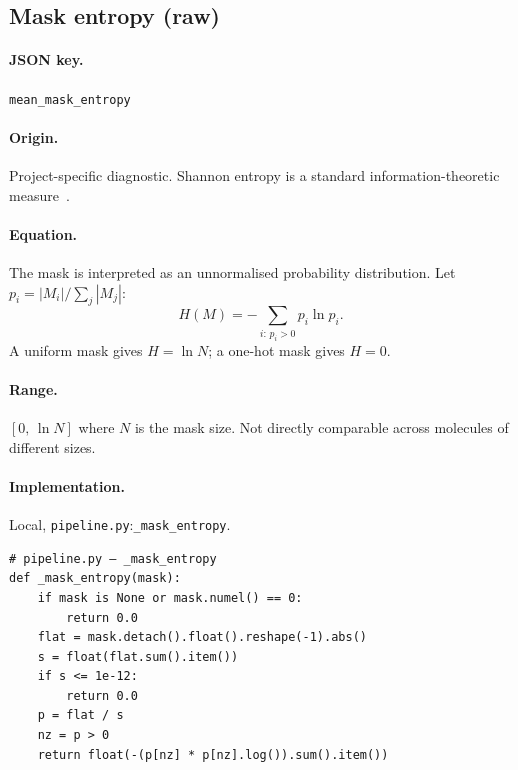 \documentclass[11pt,a4paper]{article}
\newcommand{\code}[1]{\texttt{#1}}
\newcommand{\jsonkey}[1]{\texttt{#1}}
\begin{document}
\subsection{Mask entropy (raw)}
\label{sec:entropy}

\paragraph{JSON key.} \jsonkey{mean\_mask\_entropy}

\paragraph{Origin.} Project-specific diagnostic.  Shannon entropy is a
standard information-theoretic measure~\cite{shannon1948}.

\paragraph{Equation.}
The mask is interpreted as an unnormalised probability distribution.
Let $p_i = |M_i| / \sum_j |M_j|$:
\begin{equation}
  H(M) = -\sum_{i:\, p_i > 0} p_i \ln p_i.
  \label{eq:entropy}
\end{equation}
A uniform mask gives $H = \ln N$; a one-hot mask gives $H = 0$.

\paragraph{Range.} $[0,\, \ln N]$ where $N$ is the mask size.  Not
directly comparable across molecules of different sizes.

\paragraph{Implementation.} Local,
\code{pipeline.py}:\code{\_mask\_entropy}.

\begin{verbatim}
# pipeline.py — _mask_entropy
def _mask_entropy(mask):
    if mask is None or mask.numel() == 0:
        return 0.0
    flat = mask.detach().float().reshape(-1).abs()
    s = float(flat.sum().item())
    if s <= 1e-12:
        return 0.0
    p = flat / s
    nz = p > 0
    return float(-(p[nz] * p[nz].log()).sum().item())
\end{verbatim}


\end{document}

